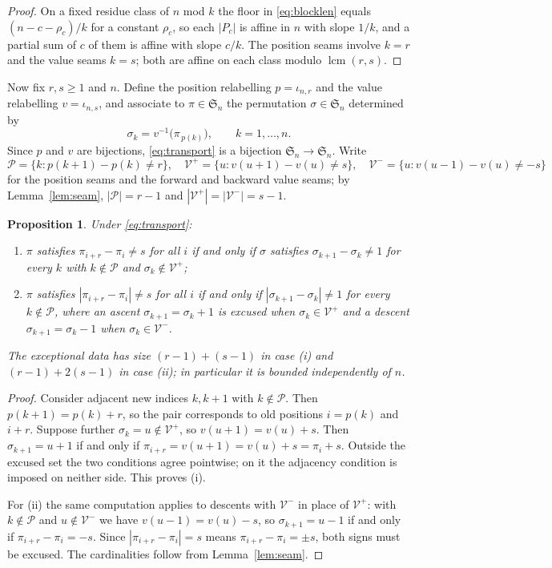 \documentclass[11pt]{article}
\newtheorem{proposition}[theorem]{Proposition}
\theoremstyle{definition}
\newcommand{\Sn}{\mathfrak{S}_n}
\begin{document}
\begin{proof}
On a fixed residue class of $n$ mod $k$ the floor in \eqref{eq:blocklen} equals
$(n-c-\rho_c)/k$ for a constant $\rho_c$, so each $|P_c|$ is affine in $n$ with
slope $1/k$, and a partial sum of $c$ of them is affine with slope $c/k$. The
position seams involve $k=r$ and the value seams $k=s$; both are affine on each
class modulo $\operatorname{lcm}(r,s)$.
\end{proof}

Now fix $r,s\ge1$ and $n$. Define the position relabelling $p=\iota_{n,r}$ and
the value relabelling $v=\iota_{n,s}$, and associate to $\pi\in\Sn$ the
permutation $\sigma\in\Sn$ determined by
\begin{equation}\label{eq:transport}
  \sigma_k=v^{-1}\bigl(\pi_{\,p(k)}\bigr),\qquad k=1,\dots,n.
\end{equation}
Since $p$ and $v$ are bijections, \eqref{eq:transport} is a bijection
$\Sn\to\Sn$. Write
\[
  \mathcal P=\{k:p(k+1)-p(k)\ne r\},\quad
  \mathcal V^{+}=\{u:v(u+1)-v(u)\ne s\},\quad
  \mathcal V^{-}=\{u:v(u-1)-v(u)\ne -s\}
\]
for the position seams and the forward and backward value seams; by
Lemma~\ref{lem:seam}, $|\mathcal P|=r-1$ and
$|\mathcal V^{+}|=|\mathcal V^{-}|=s-1$.

\begin{proposition}\label{prop:transport}
Under \eqref{eq:transport}:
\begin{enumerate}
\item[(i)] $\pi$ satisfies $\pi_{i+r}-\pi_i\ne s$ for all $i$ if and only if
$\sigma$ satisfies $\sigma_{k+1}-\sigma_k\ne1$ for every $k$ with
$k\notin\mathcal P$ and $\sigma_k\notin\mathcal V^{+}$;
\item[(ii)] $\pi$ satisfies $|\pi_{i+r}-\pi_i|\ne s$ for all $i$ if and only if
$|\sigma_{k+1}-\sigma_k|\ne1$ for every $k\notin\mathcal P$, where an ascent
$\sigma_{k+1}=\sigma_k+1$ is excused when $\sigma_k\in\mathcal V^{+}$ and a
descent $\sigma_{k+1}=\sigma_k-1$ when $\sigma_k\in\mathcal V^{-}$.
\end{enumerate}
The exceptional data has size $(r-1)+(s-1)$ in case (i) and $(r-1)+2(s-1)$ in
case (ii); in particular it is bounded independently of $n$.
\end{proposition}

\begin{proof}
Consider adjacent new indices $k,k+1$ with $k\notin\mathcal P$. Then
$p(k+1)=p(k)+r$, so the pair corresponds to old positions $i=p(k)$ and $i+r$.
Suppose further $\sigma_k=u\notin\mathcal V^{+}$, so $v(u+1)=v(u)+s$. Then
$\sigma_{k+1}=u+1$ if and only if $\pi_{i+r}=v(u+1)=v(u)+s=\pi_i+s$. Outside
the excused set the two conditions agree pointwise; on it the adjacency
condition is imposed on neither side. This proves (i).

For (ii) the same computation applies to descents with $\mathcal V^{-}$ in
place of $\mathcal V^{+}$: with $k\notin\mathcal P$ and
$u\notin\mathcal V^{-}$ we have $v(u-1)=v(u)-s$, so $\sigma_{k+1}=u-1$ if and
only if $\pi_{i+r}-\pi_i=-s$. Since $|\pi_{i+r}-\pi_i|=s$ means
$\pi_{i+r}-\pi_i=\pm s$, both signs must be excused. The cardinalities follow
from Lemma~\ref{lem:seam}.
\end{proof}
\end{document}
